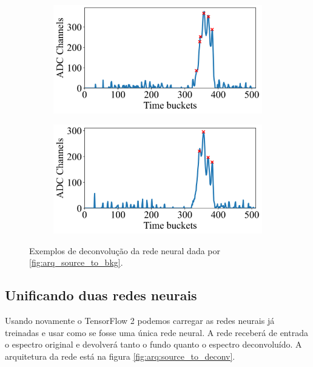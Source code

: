 \documentclass[a4paper,12pt,oneside]{book}
\begin{document}
\begin{figure}[H]
\begin{subfigure}[b]{0.49\textwidth}
        \centering
        \includegraphics[scale=0.425]{figs/np_exs3.png}
        \caption{}
        \label{subfig:exs_n_peaks_3}
    \end{subfigure}%
    \hfill
    \begin{subfigure}[b]{0.465\textwidth}
        \centering
        \includegraphics[scale=0.425]{figs/np_exs4.png}
        \caption{}
        \label{subfig:exs_n_peaks_4}
    \end{subfigure}
\caption{Exemplos de deconvolução da rede neural dada por \ref{fig:arq_source_to_bkg}.}
\label{fig:exs_n_peaks}
\end{figure}

\subsection{Unificando duas redes neurais}

\par Usando novamente o TensorFlow 2 podemos carregar as redes neurais já treinadas e usar como se fosse uma única rede neural. A rede receberá de entrada o espectro original e devolverá tanto o fundo quanto o espectro deconvoluído. A arquitetura da rede está na figura \ref{fig:arq:source_to_deconv}.
\end{document}
